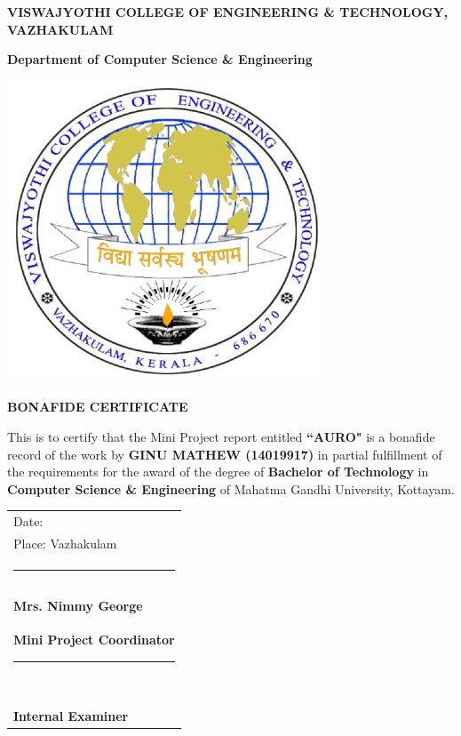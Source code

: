 \documentclass[11pt]{report}
\begin{document}
\newpage
\thispagestyle{empty}
    \begin{center}
        
        \large
        \textbf{VISWAJYOTHI COLLEGE OF ENGINEERING \& TECHNOLOGY, VAZHAKULAM}
        
        \vspace{.4cm}
        \large \textbf{Department of Computer Science \& Engineering }
        
		\vspace{0.4cm}        
        
        \includegraphics{vjcet.jpg}
        
        \vspace{0.8cm}
        
        \large \textbf{BONAFIDE CERTIFICATE}
        \vspace{0.4cm}
    \end{center}
This is to certify that the Mini Project report entitled \textbf{``AURO"} is a bonafide record of the work by \textbf{GINU MATHEW (14019917)} in partial fulfillment of the requirements for the award of the degree of \textbf{Bachelor of Technology} in \textbf{Computer Science \& Engineering} of Mahatma Gandhi University, Kottayam.
\\
\begin{tabular}[t]{@{}l}
Date:\\
Place: Vazhakulam\\
\rule{1cm}{0cm}\\ \\ \\
\textbf{Mrs. Nimmy George} \\
\textbf{Mini Project Coordinator}
\rule{1cm}{0cm}\\ \\ \\ \\ \\ \\ \\
\textbf{Internal Examiner}
\end{tabular}
\end{document}
